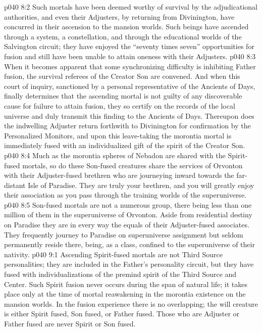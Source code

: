 \vs p040 8:2 Such mortals have been deemed worthy of survival by the adjudicational authorities, and even their Adjusters, by returning from Divinington, have concurred in their ascension to the mansion worlds. Such beings have ascended through a system, a constellation, and through the educational worlds of the Salvington circuit; they have enjoyed the “seventy times seven” opportunities for fusion and still have been unable to attain oneness with their Adjusters.
\vs p040 8:3 When it becomes apparent that some synchronizing difficulty is inhibiting Father fusion, the survival referees of the Creator Son are convened. And when this court of inquiry, sanctioned by a personal representative of the Ancients of Days, finally determines that the ascending mortal is not guilty of any discoverable cause for failure to attain fusion, they so certify on the records of the local universe and duly transmit this finding to the Ancients of Days. Thereupon does the indwelling Adjuster return forthwith to Divinington for confirmation by the Personalized Monitors, and upon this leave\hyp{}taking the morontia mortal is immediately fused with an individualized gift of the spirit of the Creator Son.
\pc \vs p040 8:4 Much as the morontia spheres of Nebadon are shared with the Spirit\hyp{}fused mortals, so do these Son\hyp{}fused creatures share the services of Orvonton with their Adjuster\hyp{}fused brethren who are journeying inward towards the far\hyp{}distant Isle of Paradise. They are truly your brethren, and you will greatly enjoy their association as you pass through the training worlds of the superuniverse.
\vs p040 8:5 Son\hyp{}fused mortals are not a numerous group, there being less than one million of them in the superuniverse of Orvonton. Aside from residential destiny on Paradise they are in every way the equals of their Adjuster\hyp{}fused associates. They frequently journey to Paradise on superuniverse assignment but seldom permanently reside there, being, as a class, confined to the superuniverse of their nativity.\plusone
{}
\vs p040 9:1 Ascending Spirit\hyp{}fused mortals are not Third Source personalities; they are included in the Father’s personality circuit, but they have fused with individualizations of the premind spirit of the Third Source and Center. Such Spirit fusion never occurs during the span of natural life; it takes place only at the time of mortal reawakening in the morontia existence on the mansion worlds. In the fusion experience there is no overlapping; the will creature is either Spirit fused, Son fused, or Father fused. Those who are Adjuster or Father fused are never Spirit or Son fused.
